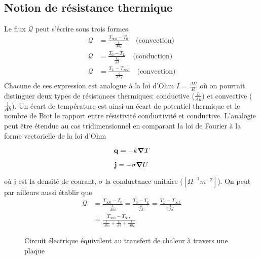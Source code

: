 \documentclass[a4paper,11pt]{report}
\newcommand{\recip}[1]{\frac{1}{#1}}
\begin{document}
    \subsection{Notion de résistance thermique}
      Le flux $\mathcal{Q}$ peut s'écrire sous trois formes
      \begin{equation}
        \begin{aligned}
          \mathcal{Q} &= \frac{T_{\infty 0} - T_0}{\recip{Ah_0}} \quad \textrm{(convection)}\\
          \mathcal{Q} &= \frac{T_0 - T_L}{\frac{T_0}{Ak}} \quad \textrm{(conduction)}\\
          \mathcal{Q} &= \frac{T_L - T_{\infty L}}{\recip{Ah_L}} \quad \textrm{(convection)}
        \end{aligned}
      \end{equation}
      Chacune de ces expression est analogue à la loi d'Ohm $I = \frac{\Delta U}{R}$ où on pourrait distinguer deux types de résistances thermiques: conductive ($\frac{L}{Ak}$) et convective ($\recip{Ah}$). Un écart de température est ainsi un écart de potentiel thermique et le nombre de Biot le rapport entre résistivité conductivité et conductive. L'analogie peut être étendue au cas tridimensionnel en comparant la loi de Fourier à la forme vectorielle de la loi d'Ohm
      \begin{multicols}{2}
        \begin{equation}
          \vb{q} = - k  \grad T \nonumber
        \end{equation}

        \begin{equation}
          \vb{j} = - \sigma \grad U
        \end{equation}
      \end{multicols}
      où j est la densité de courant, $\sigma$ la conductance unitaire ($[\si{\Omega^{-1} m^{-2}}]$). On peut par ailleurs aussi établir que
      \begin{equation}
        \begin{aligned}
          \mathcal{Q} &= \frac{T_{\infty 0} - T_0}{\recip{Ah_0}} = \frac{T_{0} - T_L}{\frac{L}{Ak}} = \frac{T_L - T_{\infty L}}{\recip{Ah_L}}\\
          &= \frac{T_{\infty 0} - T_{\infty L}}{\recip{Ah_0} + \frac{L}{Ak} + \recip{Ah_L}}
        \end{aligned}
      \end{equation}

      \begin{figure}[!h]
        \centering
        
        \caption{Circuit électrique équivalent au transfert de chaleur à travers une plaque}
        \label{fig:profilTempRes}
      \end{figure}
\end{document}
